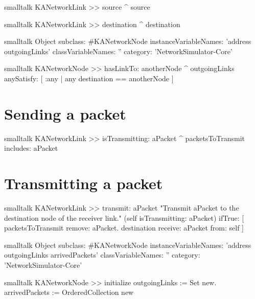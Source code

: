 \documentclass[10pt,twoside,english]{_support/latex/sbabook/sbabook}
\begin{document}
\begin{displaycode}{smalltalk}
KANetworkLink >> source
    ^ source
\end{displaycode}

\begin{displaycode}{smalltalk}
KANetworkLink >> destination
    ^ destination
\end{displaycode}

\begin{displaycode}{smalltalk}
Object subclass: #KANetworkNode
    instanceVariableNames: 'address outgoingLinks'
    classVariableNames: ''
    category: 'NetworkSimulator-Core'
\end{displaycode}

\begin{displaycode}{smalltalk}
KANetworkNode >> hasLinkTo: anotherNode
    ^ outgoingLinks
        anySatisfy: [ :any | any destination == anotherNode ]
\end{displaycode}
\section{Sending a packet}
\begin{displaycode}{smalltalk}
KANetworkLink >> isTransmitting: aPacket
    ^ packetsToTransmit includes: aPacket
\end{displaycode}
\section{Transmitting a packet}
\begin{displaycode}{smalltalk}
KANetworkLink >> transmit: aPacket
    "Transmit aPacket to the destination node of the receiver link."
    (self isTransmitting: aPacket)
        ifTrue: [
            packetsToTransmit remove: aPacket.
            destination receive: aPacket from: self ]
\end{displaycode}

\begin{displaycode}{smalltalk}
Object subclass: #KANetworkNode
    instanceVariableNames: 'address outgoingLinks arrivedPackets'
    classVariableNames: ''
    category: 'NetworkSimulator-Core'
\end{displaycode}

\begin{displaycode}{smalltalk}
KANetworkNode >> initialize
    outgoingLinks := Set new.
    arrivedPackets := OrderedCollection new
\end{displaycode}
\end{document}
